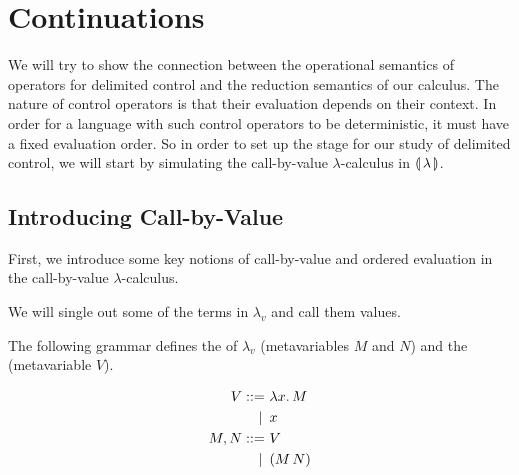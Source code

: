 \chapter{Continuations}
\label{chap:continuations}

We will try to show the connection between the operational semantics of
operators for delimited control and the reduction semantics of our
calculus. The nature of control operators is that their evaluation depends
on their context. In order for a language with such control operators to be
deterministic, it must have a fixed evaluation order. So in order to set up
the stage for our study of delimited control, we will start by simulating
the call-by-value $\lambda$-calculus in $\llparenthesis \, \lambda \, \rrparenthesis$.




\minitoc

\section{Introducing Call-by-Value}

First, we introduce some key notions of call-by-value and ordered
evaluation in the call-by-value $\lambda$-calculus.

We will single out some of the terms in $\lambda_v$ and call them values.

\begin{definition}
  The following grammar defines the  of $\lambda_v$
  (metavariables $M$ and $N$) and the  (metavariable $V$).

\begin{align*}
  V ::= &\ \lambda x.\, M \\
   | \, &\ x \\
  M, N ::= &\ V \\
   | \, &\ (M\,N)
\end{align*}
\end{definition}

